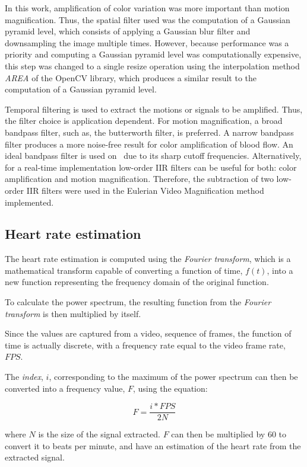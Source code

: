 \documentclass[9pt,a4paper]{extarticle}
\newcommand{\evm}{Eulerian Video Magnification}
\begin{document}
\begin{multicols}{2}
In this work, amplification of color variation was more important than
motion magnification. Thus, the spatial filter used was the computation
of a Gaussian pyramid level, which consists of applying a Gaussian blur filter
and downsampling the image multiple times. However, because performance
was a priority and computing a Gaussian pyramid level was computationally
expensive, this step was changed to a single resize operation using the
interpolation method \emph{AREA} of the OpenCV library, which produces a
similar result to the computation of a Gaussian pyramid level.

Temporal filtering is used to extract the motions or signals to be amplified.
Thus, the filter choice is application dependent. For motion magnification,
a broad bandpass filter, such as, the butterworth filter, is preferred. A
narrow bandpass filter produces a more noise-free result for color
amplification of blood flow. An ideal bandpass filter is used
on~\cite{Wu2012Eulerian} due to its sharp cutoff frequencies. Alternatively,
for a real-time implementation low-order IIR filters can be useful for both:
color amplification and motion magnification. Therefore, the subtraction
of two low-order IIR filters were used in the \evm{} method implemented.

\subsection{Heart rate estimation}\label{sec:work:heart}

The heart rate estimation is computed using the \emph{Fourier transform}, which
is a mathematical transform capable of converting
a function of time, $f(t)$, into a new function representing the frequency
domain of the original function.

To calculate the power spectrum, the resulting function from the
\emph{Fourier transform} is then multiplied by itself.

Since the values are captured from a video, sequence of frames, the function
of time is actually discrete, with a frequency rate equal to the video frame
rate, $FPS$.

The \emph{index}, $i$, corresponding to the maximum of the power spectrum can
then be converted into a frequency value, $F$, using the equation:

\begin{equation}
  F = \frac{i * FPS}{2 N}
\end{equation}

where $N$ is the size of the signal extracted. $F$ can then be multiplied by
$60$ to convert it to beats per minute, and have an estimation of the heart
rate from the extracted signal.


\end{multicols}
\end{document}

